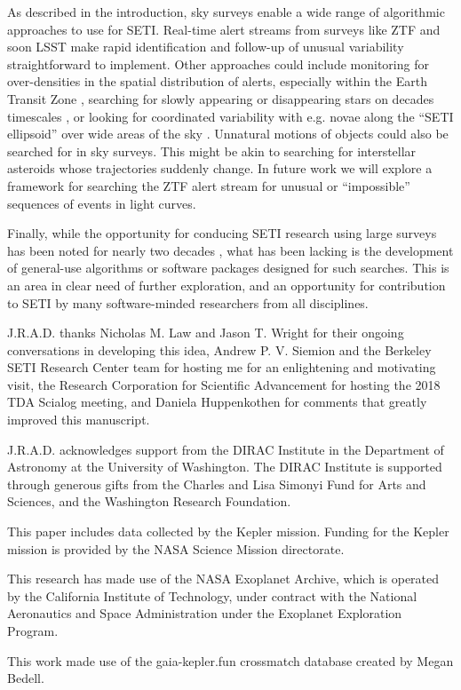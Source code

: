 \documentclass[twocolumn]{aastex62}
\begin{document}
As described in the introduction, sky surveys enable a wide range of algorithmic approaches to use for SETI. Real-time alert streams from surveys like ZTF and soon LSST \citep[e.g.][]{schwamb2019} make rapid identification and follow-up of unusual variability straightforward to implement. Other approaches could include monitoring for over-densities in the spatial distribution of alerts, especially within the Earth Transit Zone \citep{heller2016}, searching for slowly appearing or disappearing stars on decades timescales \citep{villarroel2016}, or looking for coordinated variability with e.g. novae along the ``SETI ellipsoid'' over wide areas of the sky \citep{lemarchand1994}. Unnatural motions of objects could also be searched for in sky surveys. This might be akin to searching for interstellar asteroids \citep[e.g.][]{mamajek2017} whose trajectories suddenly change. In future work we will explore a framework for searching the ZTF alert stream for unusual or ``impossible'' sequences of events in light curves.

Finally, while the opportunity for conducing SETI research using large surveys has been noted for nearly two decades \citep[e.g.][]{djorgovski2000}, what has been lacking is the development of general-use algorithms or software packages designed for such searches. This is an area in clear need of further exploration, and an opportunity for contribution to SETI by many software-minded researchers from all disciplines.



\acknowledgments

J.R.A.D. thanks Nicholas M. Law and Jason T. Wright for their ongoing conversations in developing this idea, Andrew P. V. Siemion and the Berkeley SETI Research Center team for hosting me for an enlightening and motivating visit, the Research Corporation for Scientific Advancement for hosting the 2018 TDA Scialog meeting, and Daniela Huppenkothen for comments that greatly improved this manuscript.

J.R.A.D. acknowledges support from the DIRAC Institute in the Department of Astronomy at the University of Washington. The DIRAC Institute is supported through generous gifts from the Charles and Lisa Simonyi Fund for Arts and Sciences, and the Washington Research Foundation.

This paper includes data collected by the Kepler mission. Funding for the Kepler mission is provided by the NASA Science Mission directorate.

This research has made use of the NASA Exoplanet Archive, which is operated by the California Institute of Technology, under contract with the National Aeronautics and Space Administration under the Exoplanet Exploration Program.

This work made use of the gaia-kepler.fun crossmatch database created by Megan Bedell.


\end{document}
